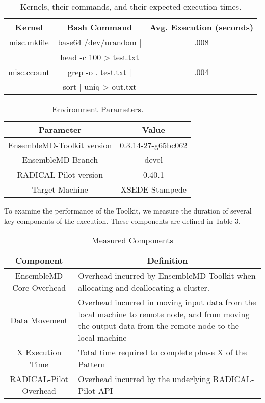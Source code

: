 \documentclass[]{article}
\begin{document}
			\begin{table}[H]
				\centering
				\begin{tabu}{|c|c|c|}
					\hline
					Kernel & Bash Command & Avg. Execution (seconds) \\
					\hline
					misc.mkfile & base64 /dev/urandom | & .008 \\ 
								& head -c 100 > test.txt  \\
					\hline
					misc.ccount & grep -o . test.txt |  & .004\\ 
								& sort | uniq > out.txt   \\
					\hline
				\end{tabu}
				\caption{Kernels, their commands, and their expected execution times.}
				\label{table:kernel_execution_table}
			\end{table}

			\begin{table}[H]
				\centering
				\begin{tabular}{|c|c|}
						\hline
						Parameter & Value \\
						\hline
						\hline
						EnsembleMD-Toolkit version & 0.3.14-27-g65bc062 \\
						\hline
						EnsembleMD Branch & devel \\
						\hline
						RADICAL-Pilot version & 0.40.1 \\
						\hline
						Target Machine & XSEDE Stampede \\
						\hline
				\end{tabular}
				\caption{Environment Parameters.}
				\label{table:environment_variables}
			\end{table}

			To examine the performance of the Toolkit, we measure the duration of several key components of the execution. These components are defined in Table 3.

			\begin{table}[H]
				\centering
				\begin{tabular}{|c|p{10cm}|}
						\hline
						Component & \multicolumn{1}{|c|}{Definition} \\
						\hline
						\hline
						EnsembleMD Core Overhead & Overhead incurred by EnsembleMD Toolkit when allocating and deallocating a cluster. \\
						\hline
						Data Movement &  Overhead incurred in moving input data from the local machine to remote node, and from moving the output data from the remote node to the local machine\\
						\hline
						X Execution Time & Total time required to complete phase X of the Pattern\\
						\hline
						RADICAL-Pilot Overhead & Overhead incurred by the underlying RADICAL-Pilot API \\
						\hline
				\end{tabular}
				\caption{Measured Components}
				\label{table:measured_components}
			\end{table}
\end{document}
